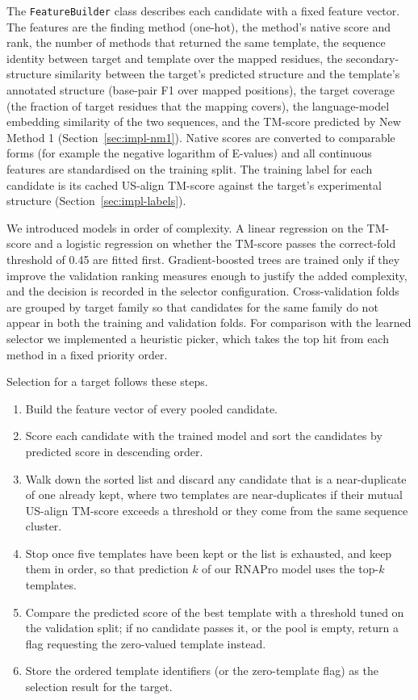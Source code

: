 \documentclass{FastFyp}
\begin{document}
The \texttt{FeatureBuilder} class describes each candidate with a fixed feature vector. The features are the finding method (one-hot), the method's native score and rank, the number of methods that returned the same template, the sequence identity between target and template over the mapped residues, the secondary-structure similarity between the target's predicted structure and the template's annotated structure (base-pair F1 over mapped positions), the target coverage (the fraction of target residues that the mapping covers), the language-model embedding similarity of the two sequences, and the TM-score predicted by New Method 1 (Section~\ref{sec:impl-nm1}). Native scores are converted to comparable forms (for example the negative logarithm of E-values) and all continuous features are standardised on the training split. The training label for each candidate is its cached US-align TM-score against the target's experimental structure (Section~\ref{sec:impl-labels}).

We introduced models in order of complexity. A linear regression on the TM-score and a logistic regression on whether the TM-score passes the correct-fold threshold of 0.45 are fitted first. Gradient-boosted trees are trained only if they improve the validation ranking measures enough to justify the added complexity, and the decision is recorded in the selector configuration. Cross-validation folds are grouped by target family so that candidates for the same family do not appear in both the training and validation folds. For comparison with the learned selector we implemented a heuristic picker, which takes the top hit from each method in a fixed priority order.

Selection for a target follows these steps.

\begin{enumerate}
\item Build the feature vector of every pooled candidate.
\item Score each candidate with the trained model and sort the candidates by predicted score in descending order.
\item Walk down the sorted list and discard any candidate that is a near-duplicate of one already kept, where two templates are near-duplicates if their mutual US-align TM-score exceeds a threshold or they come from the same sequence cluster.
\item Stop once five templates have been kept or the list is exhausted, and keep them in order, so that prediction $k$ of our RNAPro model uses the top-$k$ templates.
\item Compare the predicted score of the best template with a threshold tuned on the validation split; if no candidate passes it, or the pool is empty, return a flag requesting the zero-valued template instead.
\item Store the ordered template identifiers (or the zero-template flag) as the selection result for the target.
\end{enumerate}
\end{document}
